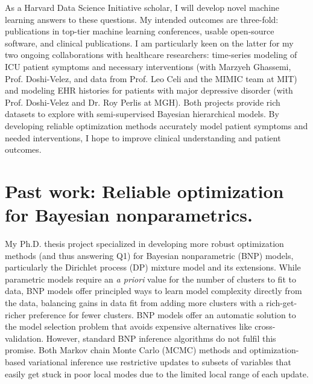 \documentclass[11pt,letterpaper,sans]{article}
\begin{document}
As a Harvard Data Science Initiative scholar, 
I will develop novel machine learning answers to these questions.
My intended outcomes are three-fold: publications in top-tier machine learning conferences, usable open-source software,
and clinical publications.
I am particularly keen on the latter for my two ongoing collaborations with healthcare researchers:
time-series modeling of ICU patient symptoms and necessary interventions (with Marzyeh Ghassemi, Prof. Doshi-Velez, and data from Prof. Leo Celi and the MIMIC team at MIT)
and modeling EHR histories for patients with major depressive disorder (with Prof. Doshi-Velez and Dr. Roy Perlis at MGH).
Both projects provide rich datasets to explore with semi-supervised Bayesian hierarchical models. By developing reliable optimization methods accurately model patient symptoms and needed interventions, I hope to improve clinical understanding and patient outcomes.






\section{Past work: Reliable optimization for Bayesian nonparametrics.}

My Ph.D. thesis project specialized in developing more robust optimization methods (and thus answering Q1) for Bayesian nonparametric (BNP) models, particularly the Dirichlet process (DP) mixture model and its extensions. 
While parametric models require an \emph{a priori} value for the number of clusters to fit to data,
BNP models offer principled ways to 
learn model complexity directly from the data,
balancing gains in data fit from adding more clusters with a rich-get-richer preference for fewer clusters.
BNP models offer an automatic solution to the model selection problem that avoids expensive alternatives like cross-validation. 
However, standard BNP inference algorithms do not fulfil this promise. Both Markov chain Monte Carlo (MCMC) methods and optimization-based variational inference use restrictive updates to subsets of variables that easily get stuck in poor local modes due to the limited local range of each update.
\end{document}
